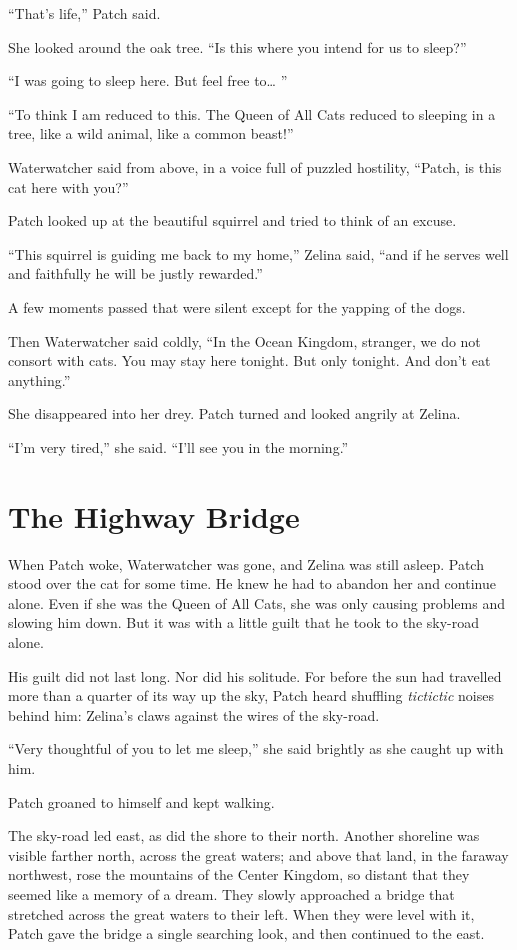 \documentclass[ebook,oneside,openany,17pt]{memoir}
\newenvironment{tolerant}[1]{%
  \par\tolerance=#1\relax
}{%
  \par
}
\renewcommand{\thechapter}{\Roman{chapter}}
\newcounter{sections}
\newcommand{\sections}[1]{%
  \section*{#1}
  \addtocounter{sections}{1}%
  \pdfbookmark[1]{#1}{section.\thechapter.\thesections}}
\begin{document}
“That’s life,” Patch said.

She looked around the oak tree. “Is this where you intend for us to
sleep?”

“I was going to sleep here. But feel free to… ”

“To think I am reduced to this. The Queen of All Cats reduced to
sleeping in a tree, like a wild animal, like a common beast!”

Waterwatcher said from above, in a voice full of puzzled hostility,
“Patch, is this cat here with you?”

\begin{tolerant}{1000}
Patch looked up at the beautiful squirrel and tried to think of an
excuse.
\end{tolerant}

“This squirrel is guiding me back to my home,” Zelina said, “and if he
serves well and faithfully he will be justly rewarded.”

A few moments passed that were silent except for the yapping of the
dogs.

Then Waterwatcher said coldly, “In the Ocean Kingdom, stranger, we do
not consort with cats. You may stay here tonight. But only
tonight. And don’t eat anything.”

She disappeared into her drey. Patch turned and looked angrily at
Zelina.

“I’m very tired,” she said. “I’ll see you in the morning.”


\sections{The Highway Bridge}

When Patch woke, Waterwatcher was gone, and Zelina was still
asleep. Patch stood over the cat for some time. He knew he had to
abandon her and continue alone. Even if she was the Queen of All Cats,
she was only causing problems and slowing him down. But it was with a
little guilt that he took to the sky-road alone.

His guilt did not last long. Nor did his solitude. For before the sun
had travelled more than a quarter of its way up the sky, Patch heard
shuffling \emph{tictictic} noises behind him: Zelina’s claws against
the wires of the sky-road.

“Very thoughtful of you to let me sleep,” she said brightly as she
caught up with him.

Patch groaned to himself and kept walking.

The sky-road led east, as did the shore to their north. Another
shoreline was visible farther north, across the great waters; and
above that land, in the faraway northwest, rose the mountains of the
Center Kingdom, so distant that they seemed like a memory of a
dream. They slowly approached a bridge that stretched across the great
waters to their left. When they were level with it, Patch gave the
bridge a single searching look, and then continued to the east.
\end{document}
